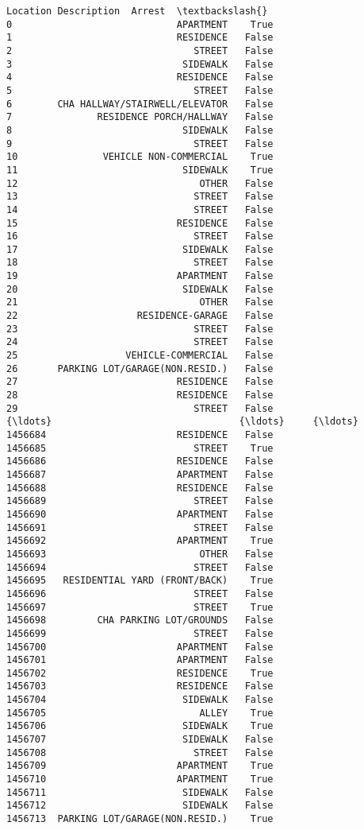 \documentclass[11pt]{article}
\begin{document}
\begin{Verbatim}[commandchars=\\\{\}]
                   Location Description  Arrest  \textbackslash{}
0                             APARTMENT    True   
1                             RESIDENCE   False   
2                                STREET   False   
3                              SIDEWALK   False   
4                             RESIDENCE   False   
5                                STREET   False   
6        CHA HALLWAY/STAIRWELL/ELEVATOR   False   
7               RESIDENCE PORCH/HALLWAY   False   
8                              SIDEWALK   False   
9                                STREET   False   
10               VEHICLE NON-COMMERCIAL    True   
11                             SIDEWALK    True   
12                                OTHER   False   
13                               STREET   False   
14                               STREET   False   
15                            RESIDENCE   False   
16                               STREET   False   
17                             SIDEWALK   False   
18                               STREET   False   
19                            APARTMENT   False   
20                             SIDEWALK   False   
21                                OTHER   False   
22                     RESIDENCE-GARAGE   False   
23                               STREET   False   
24                               STREET   False   
25                   VEHICLE-COMMERCIAL   False   
26       PARKING LOT/GARAGE(NON.RESID.)   False   
27                            RESIDENCE   False   
28                            RESIDENCE   False   
29                               STREET   False   
{\ldots}                                 {\ldots}     {\ldots}   
1456684                       RESIDENCE   False   
1456685                          STREET    True   
1456686                       RESIDENCE   False   
1456687                       APARTMENT   False   
1456688                       RESIDENCE   False   
1456689                          STREET   False   
1456690                       APARTMENT   False   
1456691                          STREET   False   
1456692                       APARTMENT    True   
1456693                           OTHER   False   
1456694                          STREET   False   
1456695   RESIDENTIAL YARD (FRONT/BACK)    True   
1456696                          STREET   False   
1456697                          STREET    True   
1456698         CHA PARKING LOT/GROUNDS   False   
1456699                          STREET   False   
1456700                       APARTMENT   False   
1456701                       APARTMENT   False   
1456702                       RESIDENCE    True   
1456703                       RESIDENCE   False   
1456704                        SIDEWALK   False   
1456705                           ALLEY    True   
1456706                        SIDEWALK    True   
1456707                        SIDEWALK   False   
1456708                          STREET   False   
1456709                       APARTMENT    True   
1456710                       APARTMENT    True   
1456711                        SIDEWALK   False   
1456712                        SIDEWALK   False   
1456713  PARKING LOT/GARAGE(NON.RESID.)    True   


\end{Verbatim}
\end{document}
